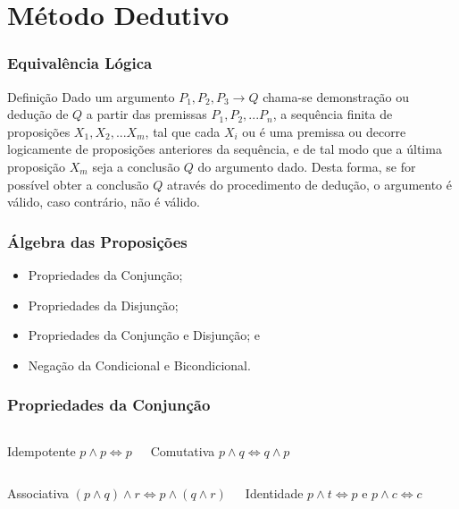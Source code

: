 \documentclass{beamer}
\begin{document}
\section{Método Dedutivo}

\begin{frame}
\frametitle{Equivalência Lógica}

\begin{block}{Definição}
Dado um argumento $P_{1}, P_{2}, P_{3} \rightarrow Q$ chama-se demonstração ou dedução de $Q$ a partir das premissas $P_{1}, P_{2}, . . . P_{n}$, a sequência finita de
proposições $X_{1}, X_{2}, . . . X_{m}$, tal que cada $X_{i}$ ou é uma premissa ou decorre logicamente de proposições anteriores da sequência, e de tal modo que a
última proposição $X_{m}$ seja a conclusão $Q$ do argumento dado. Desta forma, se for possível obter a conclusão $Q$ através do procedimento de dedução, o argumento é válido, caso contrário, não é válido.
\end{block}
\end{frame}

\begin{frame}
\frametitle{Álgebra das Proposições}

\begin{itemize}
	\item Propriedades da Conjunção;
	\item Propriedades da Disjunção;
	\item Propriedades da Conjunção e Disjunção; e
	\item Negação da Condicional e Bicondicional.
\end{itemize}
\end{frame}

\begin{frame}
\frametitle{Propriedades da Conjunção}

\begin{columns}[c]
	\large
\begin{block}{Idempotente}
$p \wedge p \Leftrightarrow p$
\end{block}\vfill

\begin{block}{Comutativa}
$p \wedge q \Leftrightarrow q \wedge p$
\end{block}
\end{columns}\vfill

\begin{columns}[c]
	\large
\begin{block}{Associativa}
$(p \wedge q) \wedge r \Leftrightarrow p \wedge (q \wedge r)$
\end{block}\vfill

\begin{block}{Identidade}
$p \wedge t \Leftrightarrow p$ e $p \wedge c \Leftrightarrow c$
\end{block}
\end{columns}\vfill

\end{frame}
\end{document}
